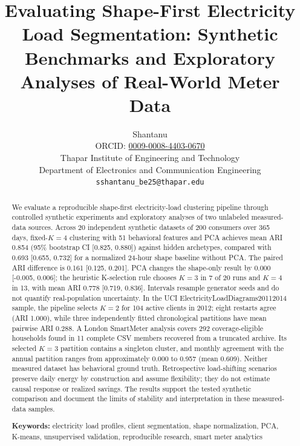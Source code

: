 \documentclass[11pt,a4paper]{article}
\title{\textbf{Evaluating Shape-First Electricity Load Segmentation: Synthetic Benchmarks and Exploratory Analyses of Real-World Meter Data}}
\author{
  Shantanu\\[6pt]
  \small ORCID: \href{https://orcid.org/0009-0008-4403-0670}{0009-0008-4403-0670}\\
  \small Thapar Institute of Engineering and Technology\\
  \small Department of Electronics and Communication Engineering\\
  \small \texttt{sshantanu\_be25@thapar.edu}
}
\date{}
\begin{document}
\maketitle

\begin{abstract}
We evaluate a reproducible shape-first electricity-load clustering pipeline through controlled synthetic experiments and exploratory analyses of two unlabeled measured-data sources. Across 20 independent synthetic datasets of 200 consumers over 365 days, fixed-$K=4$ clustering with 51 behavioral features and PCA achieves mean ARI 0.854 (95\% bootstrap CI [0.825, 0.880]) against hidden archetypes, compared with 0.693 [0.655, 0.732] for a normalized 24-hour shape baseline without PCA. The paired ARI difference is 0.161 [0.125, 0.201]. PCA changes the shape-only result by 0.000 [-0.005, 0.006]; the heuristic K-selection rule chooses $K=3$ in 7 of 20 runs and $K=4$ in 13, with mean ARI 0.778 [0.719, 0.836]. Intervals resample generator seeds and do not quantify real-population uncertainty. In the UCI ElectricityLoadDiagrams20112014 sample, the pipeline selects $K=2$ for 104 active clients in 2012; eight restarts agree (ARI 1.000), while three independently fitted chronological partitions have mean pairwise ARI 0.288. A London SmartMeter analysis covers 292 coverage-eligible households found in 11 complete CSV members recovered from a truncated archive. Its selected $K=3$ partition contains a singleton cluster, and monthly agreement with the annual partition ranges from approximately 0.000 to 0.957 (mean 0.609). Neither measured dataset has behavioral ground truth. Retrospective load-shifting scenarios preserve daily energy by construction and assume flexibility; they do not estimate causal response or realized savings. The results support the tested synthetic comparison and document the limits of stability and interpretation in these measured-data samples.

\textbf{Keywords:} electricity load profiles, client segmentation, shape normalization, PCA, K-means, unsupervised validation, reproducible research, smart meter analytics
\end{abstract}

\end{document}
